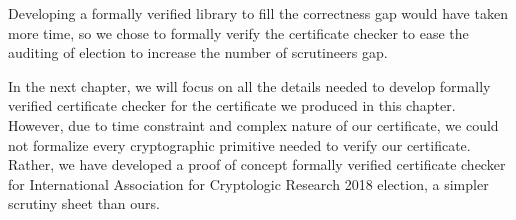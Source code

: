 Developing a formally verified library to fill the correctness gap would have taken more time,
so we chose to formally verify the certificate checker to ease the auditing of election to 
increase the number of scrutineers gap. 
 
In the next chapter, we will focus on all the details needed to 
develop formally verified certificate checker for the certificate we produced in this chapter. 
However, due to time constraint and complex nature of our certificate, we could not 
formalize every cryptographic primitive needed to verify our certificate. Rather, 
we have developed a proof of concept formally verified certificate checker for 
 International Association for Cryptologic Research 2018 election, a simpler 
 scrutiny sheet than ours.  
